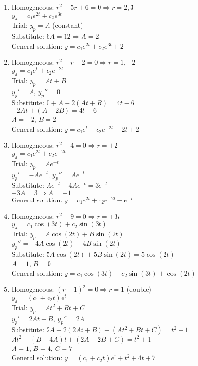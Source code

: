 \documentclass[12pt]{article}
\begin{document}
\begin{enumerate}
\item Homogeneous: $r^2 - 5r + 6 = 0 \Rightarrow r = 2, 3$\\
$y_h = c_1e^{2t} + c_2e^{3t}$\\
Trial: $y_p = A$ (constant)\\
Substitute: $6A = 12 \Rightarrow A = 2$\\
General solution: $y = c_1e^{2t} + c_2e^{3t} + 2$

\item Homogeneous: $r^2 + r - 2 = 0 \Rightarrow r = 1, -2$\\
$y_h = c_1e^t + c_2e^{-2t}$\\
Trial: $y_p = At + B$\\
$y_p' = A$, $y_p'' = 0$\\
Substitute: $0 + A - 2(At + B) = 4t - 6$\\
$-2At + (A - 2B) = 4t - 6$\\
$A = -2$, $B = 2$\\
General solution: $y = c_1e^t + c_2e^{-2t} - 2t + 2$

\item Homogeneous: $r^2 - 4 = 0 \Rightarrow r = \pm 2$\\
$y_h = c_1e^{2t} + c_2e^{-2t}$\\
Trial: $y_p = Ae^{-t}$\\
$y_p' = -Ae^{-t}$, $y_p'' = Ae^{-t}$\\
Substitute: $Ae^{-t} - 4Ae^{-t} = 3e^{-t}$\\
$-3A = 3 \Rightarrow A = -1$\\
General solution: $y = c_1e^{2t} + c_2e^{-2t} - e^{-t}$

\item Homogeneous: $r^2 + 9 = 0 \Rightarrow r = \pm 3i$\\
$y_h = c_1\cos(3t) + c_2\sin(3t)$\\
Trial: $y_p = A\cos(2t) + B\sin(2t)$\\
$y_p'' = -4A\cos(2t) - 4B\sin(2t)$\\
Substitute: $5A\cos(2t) + 5B\sin(2t) = 5\cos(2t)$\\
$A = 1$, $B = 0$\\
General solution: $y = c_1\cos(3t) + c_2\sin(3t) + \cos(2t)$

\item Homogeneous: $(r-1)^2 = 0 \Rightarrow r = 1$ (double)\\
$y_h = (c_1 + c_2t)e^t$\\
Trial: $y_p = At^2 + Bt + C$\\
$y_p' = 2At + B$, $y_p'' = 2A$\\
Substitute: $2A - 2(2At + B) + (At^2 + Bt + C) = t^2 + 1$\\
$At^2 + (B - 4A)t + (2A - 2B + C) = t^2 + 1$\\
$A = 1$, $B = 4$, $C = 7$\\
General solution: $y = (c_1 + c_2t)e^t + t^2 + 4t + 7$
\end{enumerate}
\end{document}
